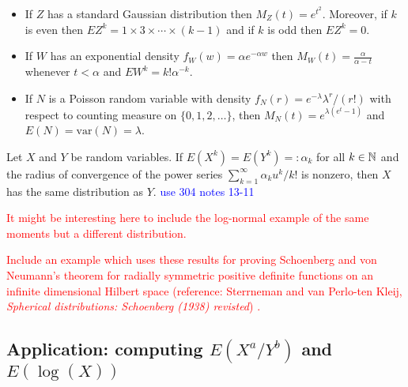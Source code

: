 \begin{corollary}$\phantom{}$
\begin{itemize}
\item
If $Z$ has a standard Gaussian distribution then $M_Z(t)=e^{t^2}$. Moreover, if $k$ is even then $EZ^k=1\times 3\times \cdots \times (k-1)$ and if $k$ is odd then $EZ^k=0$.
 \item
If $W$ has an exponential density $f_W(w) = \alpha e^{-\alpha w}$ then $M_W(t)=\frac{\alpha}{\alpha -t}$ whenever $t<\alpha$ and $EW^k= k!\alpha^{-k}$.
\item If $N$ is a Poisson random variable  with density $f_N(r) =  e^{-\lambda} \lambda^r/(r!)$ with respect to counting measure on $\{0,1,2,\ldots\}$, then $M_N(t)= e^{\lambda(e^t -1)}$ and  $E(N) = \text{var}(N) = \lambda$.
 \end{itemize}
\end{corollary}





\begin{theorem}
Let $X$ and $Y$ be random variables. If $E(X^k) = E(Y^k) =: \alpha_k $ for all $k\in \Bbb N$ and the radius of convergence of the power series $\sum_{k=1}^\infty \alpha_k u^k/k!$ is nonzero, then $X$ has the same distribution as $Y$. \textcolor{blue}{use 304 notes 13-11}
\end{theorem}


\textcolor{red}{
It might be interesting here to include the log-normal example of the same moments but a different distribution.}


\textcolor{red}{
Include an example which uses these results for proving Schoenberg and von Neumann's theorem for radially symmetric positive definite functions on an infinite dimensional Hilbert space (reference: Sterrneman and van Perlo-ten Kleij, {\em Spherical distributions: Schoenberg (1938) revisted})
.}




\subsection{Application: computing $E(X^a/Y^b)$ and $E(\log(X))$}
